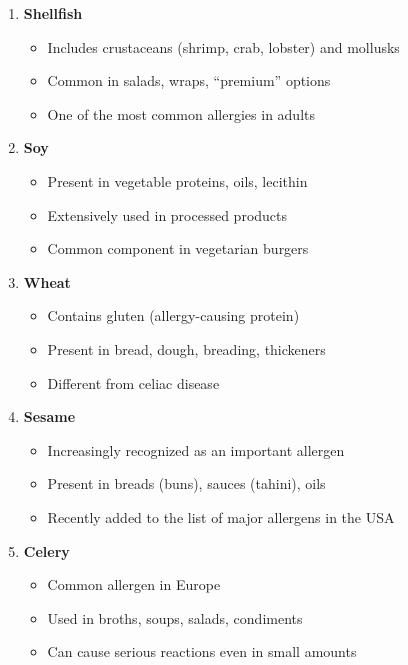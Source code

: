\documentclass[12pt,a4paper]{article}
\begin{document}
\begin{enumerate}
    \item \textbf{Shellfish}
    \begin{itemize}
        \item Includes crustaceans (shrimp, crab, lobster) and mollusks
        \item Common in salads, wraps, ``premium'' options
        \item One of the most common allergies in adults
    \end{itemize}
    
    \item \textbf{Soy}
    \begin{itemize}
        \item Present in vegetable proteins, oils, lecithin
        \item Extensively used in processed products
        \item Common component in vegetarian burgers
    \end{itemize}
    
    \item \textbf{Wheat}
    \begin{itemize}
        \item Contains gluten (allergy-causing protein)
        \item Present in bread, dough, breading, thickeners
        \item Different from celiac disease
    \end{itemize}
    
    \item \textbf{Sesame}
    \begin{itemize}
        \item Increasingly recognized as an important allergen
        \item Present in breads (buns), sauces (tahini), oils
        \item Recently added to the list of major allergens in the USA
    \end{itemize}
    
    \item \textbf{Celery}
    \begin{itemize}
        \item Common allergen in Europe
        \item Used in broths, soups, salads, condiments
        \item Can cause serious reactions even in small amounts
    \end{itemize}
\end{enumerate}
\end{document}
